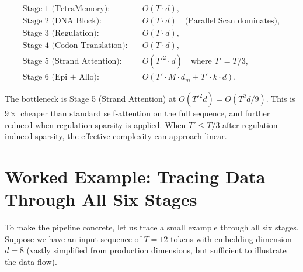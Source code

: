 \begin{align}
\text{Stage 1 (TetraMemory):} \quad & O(T \cdot d), \\
\text{Stage 2 (DNA Block):} \quad & O(T \cdot d) \quad \text{(Parallel Scan dominates)}, \\
\text{Stage 3 (Regulation):} \quad & O(T \cdot d), \\
\text{Stage 4 (Codon Translation):} \quad & O(T \cdot d), \\
\text{Stage 5 (Strand Attention):} \quad & O(T'^2 \cdot d) \quad \text{where } T' = T/3, \\
\text{Stage 6 (Epi + Allo):} \quad & O(T' \cdot M \cdot d_m + T' \cdot k \cdot d).
\end{align}

The bottleneck is Stage 5 (Strand Attention) at $O(T'^2 d) = O(T^2 d / 9)$. This is $9\times$ cheaper than standard self-attention on the full sequence, and further reduced when regulation sparsity is applied. When $T' \leq T/3$ after regulation-induced sparsity, the effective complexity can approach linear.

\section{Worked Example: Tracing Data Through All Six Stages}
\label{sec:worked-example}

To make the pipeline concrete, let us trace a small example through all six stages. Suppose we have an input sequence of $T = 12$ tokens with embedding dimension $d = 8$ (vastly simplified from production dimensions, but sufficient to illustrate the data flow).

